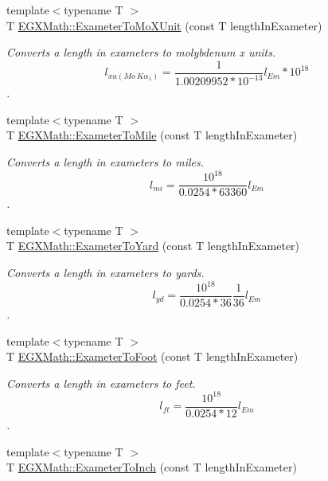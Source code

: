 \begin{DoxyCompactItemize}
{\footnotesize template$<$typename T $>$ }\\T \mbox{\hyperlink{group___e_g_x_math-_conversions-_length_conversions-_s_i-_exameter-_non-_s_i_gadf73e46609660df6b7ae77ec7241183e}{E\+G\+X\+Math\+::\+Exameter\+To\+Mo\+X\+Unit}} (const T length\+In\+Exameter)
\begin{DoxyCompactList}\small\item\em Converts a length in exameters to molybdenum x units. \[ l_{xu(Mo\ K\alpha_1)}=\frac{1}{1.00209952*10^{-13}} l_{Em} * 10^{18}\]. \end{DoxyCompactList}\item 
{\footnotesize template$<$typename T $>$ }\\T \mbox{\hyperlink{group___e_g_x_math-_conversions-_length_conversions-_s_i-_exameter-_imperial_ga352ae8fb1bf743a0978e3ed05b06b61b}{E\+G\+X\+Math\+::\+Exameter\+To\+Mile}} (const T length\+In\+Exameter)
\begin{DoxyCompactList}\small\item\em Converts a length in exameters to miles. \[ l_{mi}=\frac{10^{18}}{0.0254 * 63360} l_{Em} \]. \end{DoxyCompactList}\item 
{\footnotesize template$<$typename T $>$ }\\T \mbox{\hyperlink{group___e_g_x_math-_conversions-_length_conversions-_s_i-_exameter-_imperial_gaaa37d3bd7aa2c3a8756ca2e2830bf8ac}{E\+G\+X\+Math\+::\+Exameter\+To\+Yard}} (const T length\+In\+Exameter)
\begin{DoxyCompactList}\small\item\em Converts a length in exameters to yards. \[ l_{yd}= \frac{10^{18}}{0.0254 * 36} \frac{1}{36} l_{Em} \]. \end{DoxyCompactList}\item 
{\footnotesize template$<$typename T $>$ }\\T \mbox{\hyperlink{group___e_g_x_math-_conversions-_length_conversions-_s_i-_exameter-_imperial_gac6057a24ad10c84b86ec52c9a37f916b}{E\+G\+X\+Math\+::\+Exameter\+To\+Foot}} (const T length\+In\+Exameter)
\begin{DoxyCompactList}\small\item\em Converts a length in exameters to feet. \[ l_{ft}= \frac{10^{18}}{0.0254 * 12} l_{Em} \]. \end{DoxyCompactList}\item 
{\footnotesize template$<$typename T $>$ }\\T \mbox{\hyperlink{group___e_g_x_math-_conversions-_length_conversions-_s_i-_exameter-_imperial_gabf4408961480eb2b76d2f5c588df128e}{E\+G\+X\+Math\+::\+Exameter\+To\+Inch}} (const T length\+In\+Exameter)

\end{DoxyCompactItemize}
